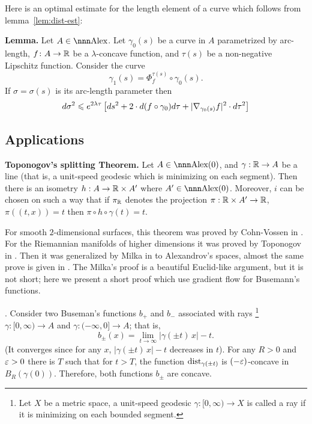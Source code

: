\documentclass{article}
\begin{document}
Here is an optimal estimate for the length element of a curve which follows from
lemma~\ref{lem:dist-est}:

\begin{thm}{\bf Lemma.} \label{lem:grad-variation} Let $A\in\Alex$.
Let $\gamma_0(s)$ be a curve in $A$ parametrized by arc-length, 
$f\colon A\to\mathbb{R}$ be a $\lambda$-concave function, 
and $\tau(s)$ be a non-negative Lipschitz function. 
Consider the curve 
$$\gamma_1(s)=\Phi^{\tau(s)}_f \circ\gamma_0(s).$$ 
If $\sigma=\sigma(s)$ is its
arc-length parameter then
$$d\sigma^2\leqslant e^{2\lambda\tau}\left[d
s^2+2\cdot d(f\circ\gamma_0)d\tau+|\nabla_{\gamma_0(s)}f|^2\cdot d\tau^2\right]$$
\end{thm}







\subsection{Applications} 

\begin{thm}{\bf Toponogov's splitting Theorem.}\label{thm:splitting} Let $A\in\Alex(0)$, and $\gamma:\mathbb{R}\to A$ be a line 
(that is, a unit-speed geodesic which is minimizing on each segment). 
Then there is an isometry $h:A\to \mathbb{R}\times A'$ where $A'\in\Alex(0)$.
Moreover, $i$ can be chosen on such a way that if $\pi_{\mathbb{R}}$ denotes the projection $\pi:\mathbb{R}\times A'\to \mathbb{R}$, $\pi((t,x))=t$ then $\pi\circ h\circ\gamma(t)=t$.
\end{thm}

For smooth $2$-dimensional surfaces, 
this theorem was proved by Cohn-Vossen in \cite{cohn-vossen_line}.
For the Riemannian manifolds of higher dimensions 
it was proved by Toponogov in \cite{toponogov-globalization+splitting}.
Then it was generalized by Milka in  \cite{milka-line}
to Alexandrov's spaces, almost the same prove is given in \cite[10.3]{BBI}.
The Milka's proof is a beautiful Euclid-like argument, but it is not short;
here we present a short proof which use gradient flow for Busemann's functions.

\Proof. Consider two Buseman's functions $b_+$ and $b_-$ associated with rays%
\footnote{Let $X$ be a metric space, a unit-speed geodesic $\gamma:[0,\infty)\to X$ is called a ray if it is minimizing on each bounded segment.} $\gamma:[0,\infty)\to A$ and $\gamma:(-\infty,0]\to A$;
that is,
$$b_\pm(x)=\lim_{t\to\infty}|\gamma(\pm t)\,x|- t.$$
(It converges since for any $x$, $|\gamma(\pm t)\,x|- t$ decreases in $t$).
For any $R>0$ and $\varepsilon>0$ there is $T$ such that for $t>T$, the function $\operatorname{dist}_{\gamma(\pm t)}$ is $(-\varepsilon)$-concave in $B_R(\gamma(0))$.
Therefore, both functions $b_\pm$ are concave.
\end{document}

